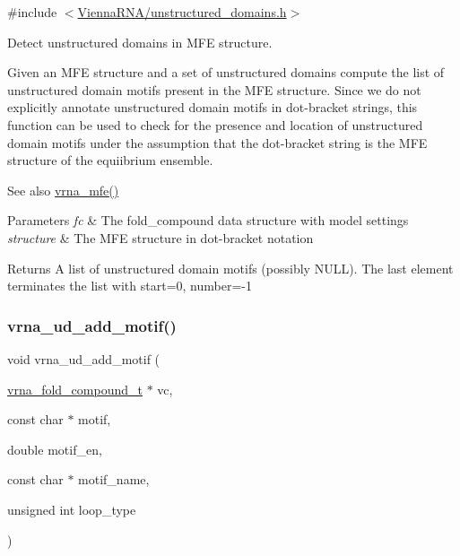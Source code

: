 {\ttfamily \#include $<$\hyperlink{unstructured__domains_8h}{Vienna\+R\+N\+A/unstructured\+\_\+domains.\+h}$>$}



Detect unstructured domains in M\+FE structure. 

Given an M\+FE structure and a set of unstructured domains compute the list of unstructured domain motifs present in the M\+FE structure. Since we do not explicitly annotate unstructured domain motifs in dot-\/bracket strings, this function can be used to check for the presence and location of unstructured domain motifs under the assumption that the dot-\/bracket string is the M\+FE structure of the equiibrium ensemble.

\begin{DoxySeeAlso}{See also}
\hyperlink{group__mfe__global_gabd3b147371ccf25c577f88bbbaf159fd}{vrna\+\_\+mfe()}
\end{DoxySeeAlso}

\begin{DoxyParams}{Parameters}
{\em fc} & The fold\+\_\+compound data structure with model settings \\
\hline
{\em structure} & The M\+FE structure in dot-\/bracket notation \\
\hline
\end{DoxyParams}
\begin{DoxyReturn}{Returns}
A list of unstructured domain motifs (possibly N\+U\+LL). The last element terminates the list with {\ttfamily start=0}, {\ttfamily number=-\/1} 
\end{DoxyReturn}
\mbox{\label{group__domains__up_ga55f7de5ef5b7472b0eeab9296b57f671}} 
\subsubsection{\texorpdfstring{vrna\+\_\+ud\+\_\+add\+\_\+motif()}{vrna\_ud\_add\_motif()}}
{\footnotesize\ttfamily void vrna\+\_\+ud\+\_\+add\+\_\+motif (\begin{DoxyParamCaption}\item[{\hyperlink{group__fold__compound_ga1b0cef17fd40466cef5968eaeeff6166}{vrna\+\_\+fold\+\_\+compound\+\_\+t} $\ast$}]{vc,  }\item[{const char $\ast$}]{motif,  }\item[{double}]{motif\+\_\+en,  }\item[{const char $\ast$}]{motif\+\_\+name,  }\item[{unsigned int}]{loop\+\_\+type }\end{DoxyParamCaption})}



